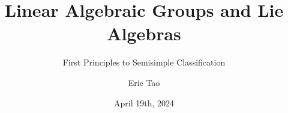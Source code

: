 \documentclass{beamer}
\title{Linear Algebraic Groups and Lie Algebras}
\subtitle[]{First Principles to Semisimple Classification}
\date{April 19th, 2024}
\author[] %
{Eric Tao}
\institute{Tufts University}
\theoremstyle{remark}
\begin{document}
\begin{frame}
  \titlepage
\end{frame}









  

\end{document}
